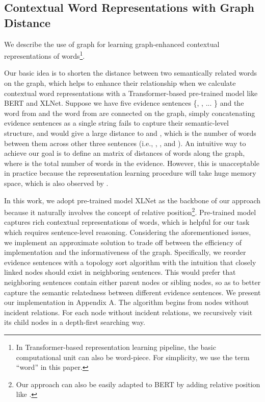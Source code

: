\documentclass[11pt,a4paper]{article}
\begin{document}
\subsection{Contextual Word Representations with Graph Distance}
\label{sec:graph-based distance}
We describe the use of graph for learning graph-enhanced contextual representations of words\footnote{In Transformer-based representation learning pipeline, the basic computational unit can also be word-piece. For simplicity, we use the term ``word'' in this paper.}. 




Our basic idea is to shorten the distance between two semantically related words on the graph, 
which helps to enhance their relationship 
when we calculate contextual word representations with a Transformer-based \cite{vaswani2017attention} pre-trained model like BERT and XLNet.
Suppose we have five evidence sentences \{, , ... \} and the word  from  and the word  from  are connected on the graph,
simply concatenating evidence sentences as a single string fails to capture their semantic-level structure, and would give a large distance to  and , which is the number of words between them across other three sentences (i.e., , , and ).
An intuitive way to achieve our goal is to define an  matrix of distances of words along the graph, where  is the total number of words in the evidence.
However, this is unacceptable in practice because the representation learning procedure will take huge memory space, which is also observed by . 

In this work, we adopt pre-trained model XLNet \cite{yang2019xlnet} as the backbone of our approach because it naturally involves the concept of relative position\footnote{Our approach can also be easily adapted to BERT by adding relative position like .}.
Pre-trained model captures rich contextual representations of words, which is helpful for our task which requires sentence-level reasoning.
Considering the aforementioned issues, we implement an approximate solution to trade off between the efficiency of implementation and the informativeness of the graph.
Specifically,
we reorder evidence sentences with a topology sort algorithm with the intuition that closely linked nodes should exist in neighboring sentences. This would prefer
that neighboring sentences contain either parent nodes or sibling nodes, so as to better capture the semantic relatedness between different evidence sentences.
We present our implementation in Appendix A. The algorithm begins from nodes without incident relations. 
For each node without incident relations, we recursively visit its child nodes in a depth-first searching way.
\end{document}
